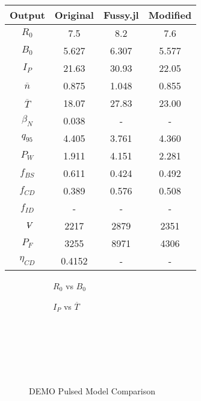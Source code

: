 \begin{table}[b!]
\begin{subtable}[t]{0.5\textwidth}
\begin{tabular}{ c|c|c|c }
Output           & Original         & Fussy.jl  & Modified      \\
\hline
$R_{0}$          & 7.5              & 8.2  &  7.6        \\
$B_{0}$          & 5.627            & 6.307  & 5.577         \\
$I_{P}$          & 21.63            & 30.93   &  22.05       \\
$\overline n$    & 0.875           & 1.048   & 0.855        \\
$\overline T$    & 18.07            & 27.83    &  23.00       \\
$\beta_{N}$       & 0.038            & - & -         \\
$q_{95}$         & 4.405            & 3.761 &   4.360         \\
$P_{W}$          & 1.911            & 4.151 &    2.281       \\
$f_{BS}$         & 0.611            & 0.424  &  0.492       \\
$f_{CD}$         & 0.389            & 0.576 &  0.508        \\
$f_{ID}$         & -              & -             & - \\
$\volume$         & 2217           & 2879 &  2351        \\
$P_{F}$          & 3255           & 8971 & 4306         \\
$\eta_{CD}$      & 0.4152           & -  & -        \\

\end{tabular}
\end{subtable}
\hfill
\hfill
\label{table:demo_steady}
\end{table}

\begin{figure*}[t!]
    \centering
    \hfill
    \begin{subfigure}[t]{0.45\textwidth}
        \centering
    \begin{adjustbox}{width=\textwidth}
      \Large
      
    \end{adjustbox}
        \caption{$R_0$ vs $B_0$}
    \end{subfigure}
    \hfill
    \begin{subfigure}[t]{0.45\textwidth}
        \centering
    \begin{adjustbox}{width=\textwidth}
      \Large
      
    \end{adjustbox}
        \caption{$I_P$ vs $\overline T$}
    \end{subfigure}
    \hfill \hfill ~\\ ~\\ ~\\
    \caption{DEMO Pulsed Model Comparison} ~\\
    \label{fig:demo_pulsed_comparison}
\end{figure*}

